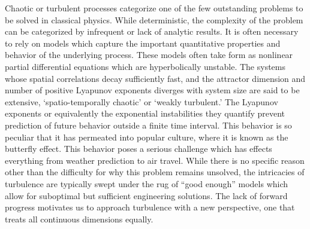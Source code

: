 



Chaotic or turbulent processes categorize one of the
few outstanding problems to be solved in classical physics.
While deterministic, the complexity of the problem
can be categorized by infrequent or lack of analytic results.
It is often necessary to rely on models which capture the
important quantitative properties and behavior of the underlying
process. These models often take form as nonlinear partial
differential equations which are hyperbolically unstable.
The systems
whose spatial correlations decay sufficiently fast, and the
attractor dimension and number of positive Lyapunov exponents
diverges with system size are said
to be extensive, `spatio-temporally chaotic' or `weakly
turbulent.'
The Lyapunov exponents or equivalently the exponential instabilities
they quantify prevent prediction of future behavior outside a
finite time interval.
This behavior is so peculiar that it has permeated into popular culture,
where it is known as the butterfly effect. This behavior poses a serious
challenge which has effects everything from weather prediction to
air travel. While there is no specific reason other than the difficulty
for why this problem remains unsolved, the intricacies of turbulence
are typically swept under the rug of ``good enough'' models
which allow for suboptimal but sufficient engineering solutions.
The lack of forward progress motivates us to approach turbulence with a new
perspective, one that treats all continuous dimensions equally.

